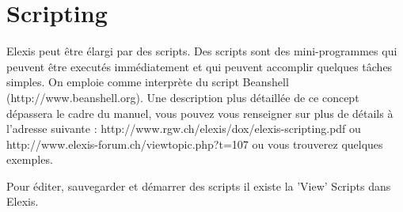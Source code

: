 %

\section{Scripting}
\label{Script}
Elexis peut être élargi par des scripts. Des scripts sont des mini-programmes qui peuvent être executés immédiatement et qui peuvent accomplir quelques tâches simples.
On emploie comme interprète du script Beanshell (http://www.beanshell.org). Une description plus détaillée de ce concept dépassera le cadre du manuel, vous pouvez vous renseigner sur plus de détails à l'adresse suivante : http://www.rgw.ch/elexis/dox/elexis-scripting.pdf ou
http://www.elexis-forum.ch/viewtopic.php?t=107 ou vous trouverez quelques exemples.


\bigskip
Pour éditer, sauvegarder et démarrer des scripts il existe la 'View' Scripts dans Elexis.
